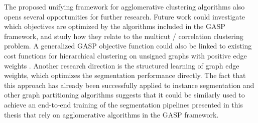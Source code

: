 The proposed unifying framework for agglomerative clustering algorithms also opens several opportunities for further research. Future work could investigate which objectives are optimized by the algorithms included in the GASP framework, and study how they relate to the multicut / correlation clustering problem. A generalized GASP objective function could also be linked to existing cost functions for hierarchical clustering on unsigned graphs with positive edge weights \cite{moseley2017approximation,cohen2019hierarchical,dasgupta2016cost}. 
Another research direction is the structured learning of graph edge weights, which optimizes the segmentation performance directly. The fact that this approach has already been successfully applied to instance segmentation and other graph partitioning algorithms \cite{funke2018large,kong2018recurrentPix,wolf2017learned,cerrone2019end} suggests that it could be similarly used to achieve an end-to-end training of the segmentation pipelines presented in this thesis that rely on agglomerative algorithms in the GASP framework.
